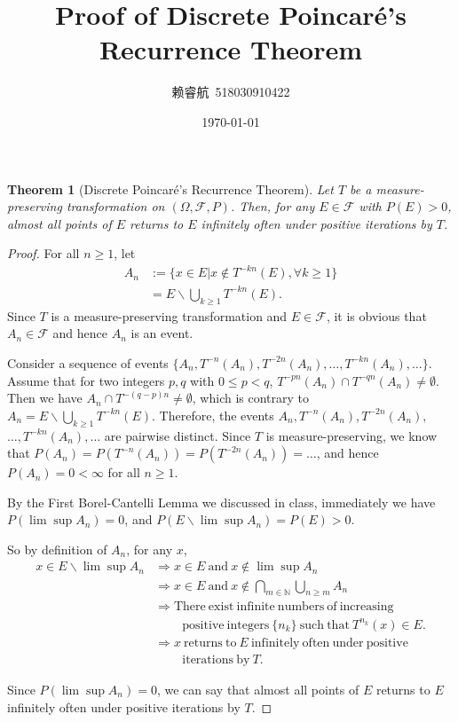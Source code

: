 \documentclass[a4paper, linespread=1.5]{article}
\newtheorem{theorem}{Theorem}
\newcommand{\Natural}{\mathbb{N}}
\begin{document}
    \title{Proof of Discrete Poincar\'{e}'s Recurrence Theorem}
    \author{赖睿航\ 518030910422}
    \date{\today}
    \maketitle
    
    \begin{theorem}[Discrete Poincar\'{e}'s Recurrence Theorem]
        Let $T$ be a measure-preserving transformation on $(\Omega, \mathcal{F}, P)$. Then, for any $E \in \mathcal{F}$ with $P(E) > 0$, almost all points of $E$ returns to $E$ infinitely often under positive iterations by $T$.
    \end{theorem}
    
    \begin{proof}
        For all $n \geqslant 1$, let
        \begin{align*}
            A_n &:= \{x \in E | x \notin T^{-kn}(E), \forall k \geqslant 1\} \\
            &= E \backslash \bigcup_{k \geqslant 1} T^{-kn}(E).
        \end{align*}
        Since $T$ is a measure-preserving transformation and $E \in \mathcal{F}$, it is obvious that $A_n \in \mathcal{F}$ and hence $A_n$ is an event.
        
        Consider a sequence of events $\{A_n, T^{-n}(A_n), T^{-2n}(A_n), \ldots, T^{-kn}(A_n), \ldots\}$. Assume that for two integers $p, q$ with $0 \leqslant p < q$, $T^{-pn}(A_n) \cap T^{-qn}(A_n) \neq \emptyset$. Then we have $A_n \cap T^{-(q - p)n} \neq \emptyset$, which is contrary to $A_n = E \backslash \bigcup_{k \geqslant 1} T^{-kn}(E)$. Therefore, the events $A_n, T^{-n}(A_n), T^{-2n}(A_n),$ $ \ldots, T^{-kn}(A_n), \ldots$ are pairwise distinct. Since $T$ is measure-preserving, we know that $P(A_n) = P(T^{-n}(A_n)) = P(T^{-2n}(A_n)) = \ldots$, and hence $P(A_n) = 0 < \infty$ for all $n \geqslant 1$.
        
        By the First Borel-Cantelli Lemma we discussed in class, immediately we have $P(\lim \sup A_n) = 0$, and $P(E \backslash \lim \sup A_n) = P(E) > 0$.
        
        So by definition of $A_n$, for any $x$,
        \begin{align*}
            x \in E \backslash \lim \sup A_n &\Longrightarrow x \in E \mathrm{\ and\ } x \notin \lim \sup A_n \\
            &\Longrightarrow x \in E \mathrm{\ and\ } x \notin \bigcap_{m \in \Natural}\bigcup_{n \geqslant m} A_n \\
            &\Longrightarrow \mathrm{There\ exist\ infinite\ numbers\ of\ increasing}\\&\qquad\ \mathrm{positive\ integers\ } \{n_k\} \mathrm{\ such\ that\ } T^{n_k}(x) \in E. \\
            &\Longrightarrow x \mathrm{\ returns\ to\ } E \mathrm{\ infinitely\ often\ under\ positive}\\&\qquad\ \mathrm{iterations\ by\ } T.
        \end{align*}
        
        Since $P(\lim \sup A_n) = 0$, we can say that almost all points of $E$ returns to $E$ infinitely often under positive iterations by $T$.
    \end{proof}
    
\end{document}
